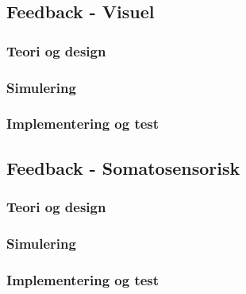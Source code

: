 \subsection{Feedback - Visuel}
\subsubsection{Teori og design}
\subsubsection{Simulering}
\subsubsection{Implementering og test}
\subsection{Feedback - Somatosensorisk}
\subsubsection{Teori og design}
\subsubsection{Simulering}
\subsubsection{Implementering og test}

